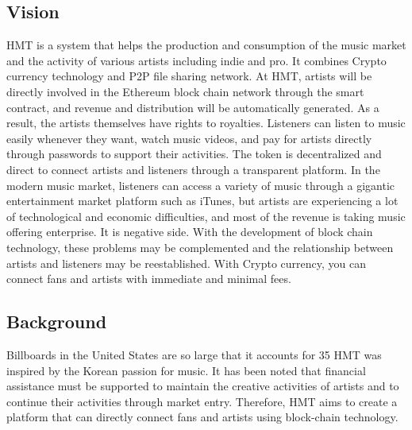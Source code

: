 \documentclass[conference]{IEEEtran}
\begin{document}
\subsection{Vision}
HMT is a system that helps the production and consumption of the music market and the activity of various artists including indie and pro. It combines Crypto currency technology and P2P file sharing network. At HMT, artists will be directly involved in the Ethereum block chain network through the smart contract, and revenue and distribution will be automatically generated. As a result, the artists themselves have rights to royalties. Listeners can listen to music easily whenever they want, watch music videos, and pay for artists directly through passwords to support their activities. The token is decentralized and direct to connect artists and listeners through a transparent platform. In the modern music market, listeners can access a variety of music through a gigantic entertainment market platform such as iTunes, but artists are experiencing a lot of technological and economic difficulties, and most of the revenue is taking music offering enterprise.
It is negative side. With the development of block chain technology, these problems may be complemented and the relationship between artists and listeners may be reestablished. With Crypto currency, you can connect fans and artists with immediate and minimal fees. 

\subsection{Background}
Billboards in the United States are so large that it accounts for 35%
HMT was inspired by the Korean passion for music. It has been noted that financial assistance must be supported to maintain the creative activities of artists and to continue their activities through market entry. Therefore, HMT aims to create a platform that can directly connect fans and artists using block-chain technology.
\end{document}
